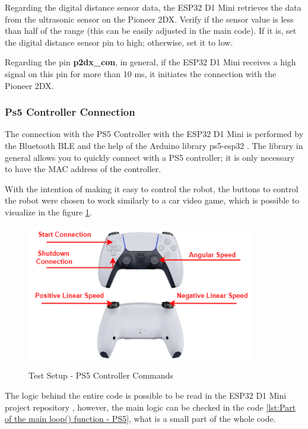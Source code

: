 \documentclass[../../monografia.tex]{subfiles}
\begin{document}
Regarding the digital distance sensor data, the ESP32 D1 Mini retrieves the data from the ultrasonic sensor on the Pioneer 2DX. Verify if the sensor value is less than half of the range (this can be easily adjusted in the main code). If it is, set the digital distance sensor pin to high; otherwise, set it to low.

Regarding the pin \textbf{p2dx\_con}, in general, if the ESP32 D1 Mini receives a high signal on this pin for more than 10 ms, it initiates the connection with the Pioneer 2DX.

\subsubsection{Ps5 Controller Connection}

The connection with the PS5 Controller with the ESP32 D1 Mini is performed by the Bluetooth BLE \cite{bluetooth_ble_2025} and the help of the Arduino library ps5-esp32 \cite{ps5-esp32_2024}. The library in general allows you to quickly connect with a PS5 controller; it is only necessary to have the MAC address of the controller.

With the intention of making it easy to control the robot, the buttons to control the robot were chosen to work similarly to a car video game, which is possible to visualize in the figure \ref{fig: Test Setup - PS5 Controller Commands}.

\begin{figure}[h!]
    \caption{Test Setup - PS5 Controller Commands}
    \centering
    \includegraphics[width=10cm]{diagramas-test_setup-pioneer_2dx_interface-ps5.drawio.png}
    \label{fig: Test Setup - PS5 Controller Commands}
\end{figure}

The logic behind the entire code is possible to be read in the ESP32 D1 Mini project repository \cite{pioneer_2dx_interface_esp32_2024}, however, the main logic can be checked in the code \ref{lst:Part of the main loop() function - PS5}, what is a small part of the whole code.
\end{document}
